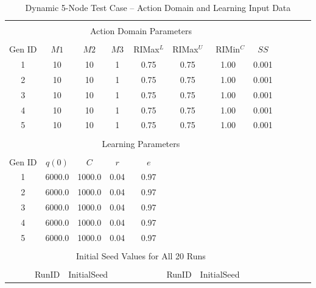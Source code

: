 \documentclass[12pt]{article}
\begin{document}
\begin{table}[h]
	\caption{Dynamic 5-Node Test Case -- Action Domain and Learning Input Data} 
	\label{tab: 5NodeInput.Learning}
\begin{minipage}{\textwidth}
	\centering
\begin{tabular}{cccccccccccc} 

\hline\hline\\[0.1ex]

\multicolumn{8}{c}{Action Domain Parameters} \\ [0.5ex]

\\Gen ID   &  $M1$  & $M2$   &  $M3$  &  RIMax$^L$ & RIMax$^U$  & ~RIMin$^C$ &  $SS$    \\[0.5ex]
     1	   &  10    & 10     &  1     &  0.75      & 0.75	 &  1.00      &  0.001   \\
     2	   &  10    & 10     &  1     &  0.75      & 0.75	 &  1.00      &  0.001   \\
     3	   &  10    & 10     &  1     &  0.75      & 0.75	 &  1.00      &  0.001   \\
     4	   &  10    & 10     &  1     &  0.75      & 0.75	 &  1.00      &  0.001   \\
     5	   &  10    & 10     &  1     &  0.75      & 0.75	 &  1.00      &  0.001   \\ 

\\

\multicolumn{8}{c}{Learning Parameters} \\ [0.5ex]

\\Gen ID   & $q(0)$  & $C$  & $r$  &  $e$    \\[0.5ex]
     1	   &  6000.0  & 1000.0 & 0.04 & 0.97 \\
     2	   &  6000.0  & 1000.0 & 0.04 & 0.97 \\
     3	   &  6000.0  & 1000.0 & 0.04 & 0.97 \\
     4	   &  6000.0  & 1000.0 & 0.04 & 0.97 \\
     5	   &  6000.0  & 1000.0 & 0.04 & 0.97 \\

\\ \multicolumn{8}{c}{Initial Seed Values for All 20 Runs} \\ [0.5ex]

\\\multicolumn{4}{c}{~~RunID~~InitialSeed} & \multicolumn{4}{c}{RunID~~InitialSeed}   \\[0.5ex]


\end{tabular}
\end{minipage}
\end{table}
\end{document}
